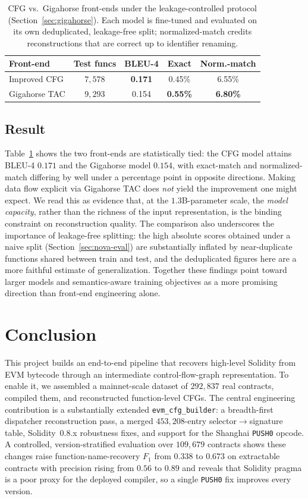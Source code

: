 \documentclass{article}
\begin{document}
\begin{table}[t]
\centering
\caption{CFG vs.\ Gigahorse front-ends under the leakage-controlled protocol
(Section~\ref{sec:gigahorse}). Each model is fine-tuned and evaluated on its own
deduplicated, leakage-free split; normalized-match credits reconstructions that
are correct up to identifier renaming.}
\label{tab:frontend}
\small
\begin{tabular}{l c c c c}
\toprule
Front-end & Test funcs & BLEU-4 & Exact & Norm.-match \\
\midrule
Improved CFG   & $7{,}578$ & \textbf{0.171} & 0.45\% & 6.55\% \\
Gigahorse TAC  & $9{,}293$ & 0.154 & \textbf{0.55\%} & \textbf{6.80\%} \\
\bottomrule
\end{tabular}
\end{table}

\subsection{Result}
Table~\ref{tab:frontend} shows the two front-ends are statistically tied: the CFG
model attains BLEU-4 $0.171$ and the Gigahorse model $0.154$, with exact-match and
normalized-match differing by well under a percentage point in opposite directions.
Making data flow explicit via Gigahorse TAC does \emph{not} yield the improvement
one might expect. We read this as evidence that, at the $1.3$B-parameter scale, the
\emph{model capacity}, rather than the richness of the input representation, is the
binding constraint on reconstruction quality. The comparison also underscores the
importance of leakage-free splitting: the high absolute scores obtained under a
naive split (Section~\ref{sec:nova-eval}) are substantially inflated by
near-duplicate functions shared between train and test, and the deduplicated
figures here are a more faithful estimate of generalization. Together these
findings point toward larger models and semantics-aware training objectives as a
more promising direction than front-end engineering alone.

\section{Conclusion}

This project builds an end-to-end pipeline that recovers high-level Solidity from
EVM bytecode through an intermediate control-flow-graph representation. To enable
it, we assembled a mainnet-scale dataset of $292{,}837$ real contracts, compiled
them, and reconstructed function-level CFGs. The central engineering contribution
is a substantially extended \texttt{evm\_cfg\_builder}: a breadth-first dispatcher
reconstruction pass, a merged $453{,}208$-entry selector$\rightarrow$signature
table, Solidity~0.8.x robustness fixes, and support for the Shanghai
\texttt{PUSH0} opcode. A controlled, version-stratified evaluation over $109{,}679$
contracts shows these changes raise function-name-recovery $F_1$ from $0.338$ to
$0.673$ on extractable contracts with precision rising from $0.56$ to $0.89$ and
reveals that Solidity pragma is a poor proxy for the deployed compiler, so a single
\texttt{PUSH0} fix improves every version.
\end{document}
